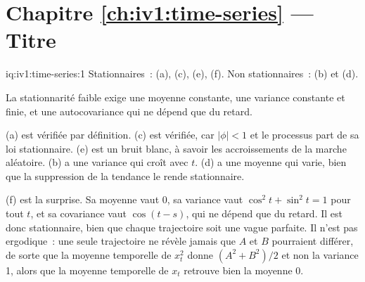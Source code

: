 \section*{Chapitre \ref{ch:iv1:time-series} --- Titre}

\begin{solution}{iq:iv1:time-series:1}
Stationnaires~: (a), (c), (e), (f). Non stationnaires~: (b) et (d).

La stationnarité faible exige une moyenne constante, une variance constante et finie, et une autocovariance qui ne dépend que du retard.

(a) est vérifiée par définition. (c) est vérifiée, car $|\phi| < 1$ et le processus part de sa loi stationnaire. (e) est un bruit blanc, à savoir les accroissements de la marche aléatoire. (b) a une variance qui croît avec $t$. (d) a une moyenne qui varie, bien que la suppression de la tendance le rende stationnaire.

(f) est la surprise. Sa moyenne vaut 0, sa variance vaut $\cos^2t + \sin^2t = 1$ pour tout $t$, et sa covariance vaut $\cos(t - s)$, qui ne dépend que du retard. Il est donc stationnaire, bien que chaque trajectoire soit une vague parfaite. Il n'est pas ergodique~: une seule trajectoire ne révèle jamais que $A$ et $B$ pourraient différer, de sorte que la moyenne temporelle de $x_t^2$ donne $(A^2 + B^2)/2$ et non la variance 1, alors que la moyenne temporelle de $x_t$ retrouve bien la moyenne 0.



\end{solution}

